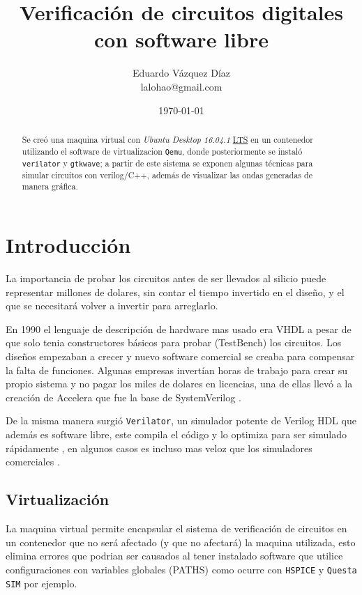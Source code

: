 \documentclass[11pt]{/home/hao/dev/org/latex-plantilla/IEEEtran}
\author{Eduardo Vázquez Díaz \\ lalohao@gmail.com}
\date{\today}
\title{Verificación de circuitos digitales con software libre}
\begin{document}
\maketitle
\tableofcontents

\begin{abstract}
Se creó una maquina virtual con \emph{Ubuntu Desktop 16.04.1} \uline{LTS} en un
contenedor utilizando el software de virtualizacion \texttt{Qemu}, donde
posteriormente se instaló \texttt{verilator} y \texttt{gtkwave}; a partir de este
sistema se exponen algunas técnicas para simular circuitos con
verilog/C++, además de visualizar las ondas generadas de manera
gráfica.
\end{abstract}

\section{Introducción}
\label{sec:org2277f6f}
La importancia de probar los circuitos antes de ser llevados al
silicio puede representar millones de dolares, sin contar el tiempo
invertido en el diseño, y el que se necesitará volver a invertir
para arreglarlo.

En 1990 el lenguaje de descripción de hardware mas usado era VHDL a
pesar de que solo tenia constructores básicos para probar
(TestBench) los circuitos. Los diseños empezaban a crecer y nuevo
software comercial se creaba para compensar la falta de funciones.
Algunas empresas invertían horas de trabajo para crear su propio
sistema y no pagar los miles de dolares en licencias, una de ellas
llevó a la creación de Accelera que fue la base de SystemVerilog
\cite{spear08_system}.

De la misma manera surgió \texttt{Verilator}, un simulador potente de
Verilog HDL que además es software libre, este compila el código y
lo optimiza para ser simulado rápidamente \cite{verilator-intro}, en
algunos casos es incluso mas veloz que los simuladores comerciales
\cite{verilator-vs-comercial}.

\subsection{Virtualización}
\label{sec:orgdc62dd6}
La maquina virtual permite encapsular el sistema de verificación de
circuitos en un contenedor que no será afectado (y que no afectará)
la maquina utilizada, esto elimina errores que podrian ser causados
al tener instalado software que utilice configuraciones con
variables globales (PATHS) como ocurre con \texttt{HSPICE} y \texttt{Questa SIM}
por ejemplo.
\end{document}
